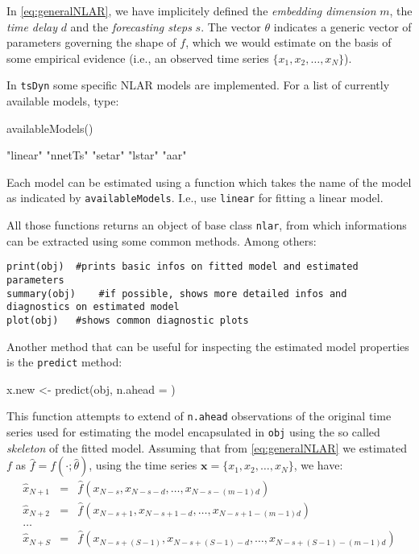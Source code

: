 \documentclass[a4paper]{article}
\newcommand{\tsDyn}{\texttt{tsDyn} }
\begin{document}
In \eqref{eq:generalNLAR}, we have implicitely defined the \emph{embedding dimension} $m$, the 
\emph{time delay} $d$ and the \emph{forecasting steps} $s$. The vector $\theta$ indicates a generic vector of parameters governing the shape of $f$, which we would estimate on the basis of some empirical evidence (i.e., an observed time series $\{x_1,x_2,\ldots,x_N\}$).

In \tsDyn some specific NLAR models are implemented. For a list of currently available models, type:
\begin{Schunk}
\begin{Sinput}
 availableModels()
\end{Sinput}
\begin{Soutput}
[1] "linear" "nnetTs" "setar"  "lstar"  "aar"   
\end{Soutput}
\end{Schunk}

Each model can be estimated using a function which takes the name of the model as indicated by 
\texttt{availableModels}. I.e., use \texttt{linear} for fitting a linear model.

All those functions returns an object of base class \texttt{nlar}, from which informations can be extracted using some common methods. Among others:
\begin{verbatim}
print(obj)	#prints basic infos on fitted model and estimated parameters
summary(obj)	#if possible, shows more detailed infos and diagnostics on estimated model
plot(obj)	#shows common diagnostic plots
\end{verbatim}

Another method that can be useful for inspecting the estimated model properties is the \texttt{predict} method:
\begin{Schunk}
\begin{Sinput}
 x.new <- predict(obj, n.ahead = )
\end{Sinput}
\end{Schunk}
This function attempts to extend of \texttt{n.ahead} observations of the original time series used for estimating the model encapsulated in \texttt{obj} using the so called \emph{skeleton} of the fitted model. Assuming that from \eqref{eq:generalNLAR} we estimated $f$ as $\hat{f} = f(\cdot; \hat{\theta})$, using the time series $\mathbf{x} = \{x_1, x_2, \ldots, x_N\}$, we have:
\begin{eqnarray*}
\hat x_{N+1} &=& \hat{f}(x_{N-s}, x_{N - s - d}, \ldots, x_{N - s -(m-1)d})\\
\hat x_{N+2} &=& \hat{f}(x_{N-s+1}, x_{N - s + 1 - d}, \ldots, x_{N - s + 1 -(m-1)d})\\
\ldots \\
\hat x_{N+S} &=& \hat{f}(x_{N-s+(S-1)}, x_{N - s + (S - 1) - d}, \ldots, x_{N - s + (S - 1) -(m-1)d})
\end{eqnarray*}
\end{document}
